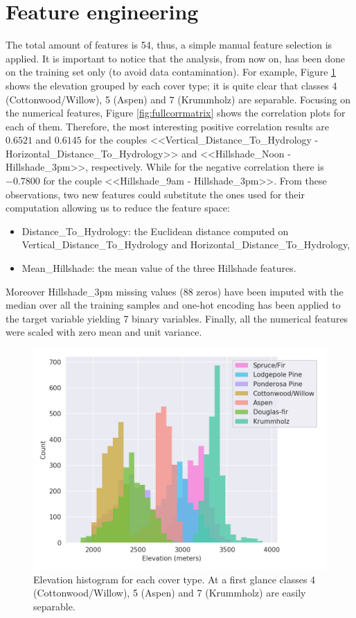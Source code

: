 \section{Feature engineering}
The total amount of features is 54, thus, a simple manual feature selection is applied. It is important to notice that the analysis, from now on, has been done on the training set only (to avoid data contamination). For example, Figure \ref{fig:elevationhist} shows the elevation grouped by each cover type; it is quite clear that classes 4 (Cottonwood/Willow), 5 (Aspen) and 7 (Krummholz) are separable. Focusing on the numerical features, Figure \ref{fig:fullcorrmatrix} shows the correlation plots for each of them. Therefore, the most interesting positive correlation results are $0.6521$ and $0.6145$ for the couples <<Vertical\_Distance\_To\_Hydrology - Horizontal\_Distance\_To\_Hydrology>> and <<Hillshade\_Noon - Hillshade\_3pm>>, respectively. While for the negative correlation there is $-0.7800$ for the couple <<Hillshade\_9am - Hillshade\_3pm>>. From these observations, two new features could substitute the ones used for their computation allowing us to reduce the feature space:
\begin{itemize}
\item Distance\_To\_Hydrology: the Euclidean distance computed on Vertical\_Distance\_To\_Hydrology and Horizontal\_Distance\_To\_Hydrology,
\item Mean\_Hillshade: the mean value of the three Hillshade features.
\end{itemize}
Moreover Hillshade\_3pm missing values ($88$ zeros) have been imputed with the median over all the training samples and one-hot encoding has been applied to the target variable yielding 7 binary variables. Finally, all the numerical features were scaled with zero mean and unit variance.
\begin{figure}
\centering
\includegraphics[width=\textwidth]{./TeX_files/img/elevationhist.png}
\caption{Elevation histogram for each cover type. At a first glance classes 4 (Cottonwood/Willow), 5 (Aspen) and 7 (Krummholz) are easily separable.}
\label{fig:elevationhist}
\end{figure}
